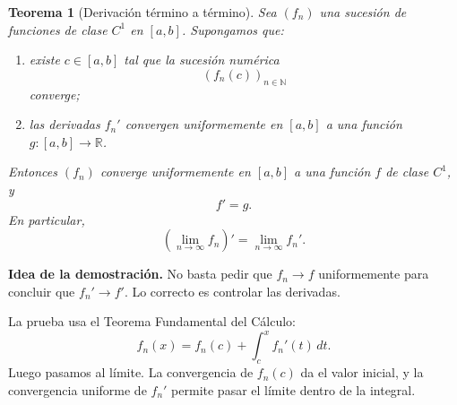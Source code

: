 \documentclass[11pt,a4paper,openany]{book}
\theoremstyle{definition}
\theoremstyle{plain}
\newtheorem{teorema}{Teorema}[chapter]
\theoremstyle{remark}
\newenvironment{idea}
{\begin{comentariolibro}\textbf{Idea de la demostración. }\normalfont}
{\end{comentariolibro}}
\newcommand{\R}{\mathbb{R}}
\newcommand{\N}{\mathbb{N}}
\begin{document}
\begin{grisplano}
\begin{teorema}[Derivación término a término]
Sea $(f_n)$ una sucesión de funciones de clase $C^1$ en $[a,b]$.
Supongamos que:

\begin{enumerate}
    \item existe $c\in[a,b]$ tal que la sucesión numérica
    \[
        (f_n(c))_{n\in\N}
    \]
    converge;

    \item las derivadas $f_n'$ convergen uniformemente en $[a,b]$ a una función
    $g:[a,b]\to\R$.
\end{enumerate}

Entonces $(f_n)$ converge uniformemente en $[a,b]$ a una función $f$ de clase
$C^1$, y
\[
    f'=g.
\]
En particular,
\[
    \left(\lim_{n\to\infty} f_n\right)'
    =
    \lim_{n\to\infty} f_n'.
\]
\end{teorema}
\end{grisplano}

\begin{idea}
No basta pedir que $f_n\to f$ uniformemente para concluir que
$f_n'\to f'$. Lo correcto es controlar las derivadas.

La prueba usa el Teorema Fundamental del Cálculo:
\[
    f_n(x)=f_n(c)+\int_c^x f_n'(t)\,dt.
\]
Luego pasamos al límite. La convergencia de $f_n(c)$ da el valor inicial, y la
convergencia uniforme de $f_n'$ permite pasar el límite dentro de la integral.
\end{idea}
\end{document}
